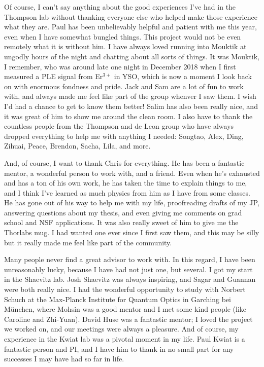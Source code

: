 \documentclass[12pt]{report}
\newcommand{\erbium}[1][ ]{Er$^{3+}$#1}
\begin{document}
Of course, I can't say anything about the good experiences I've had in the Thompson lab without thanking everyone else who helped make those experience what they are. Paul has been unbelievably helpful and patient with me this year, even when I have somewhat bungled things. This project would not be even remotely what it is without him. I have always loved running into Mouktik at ungodly hours of the night and chatting about all sorts of things. It was Mouktik, I remember, who was around late one night in December 2018 when I first measured a PLE signal from \erbium in YSO, which is now a moment I look back on with enormous fondness and pride. Jack and Sam are a lot of fun to work with, and always made me feel like part of the group whenver I saw them. I wish I'd had a chance to get to know them better! Salim has also been really nice, and it was great of him to show me around the clean room. I also have to thank the countless people from the Thompson and de Leon group who have always dropped everything to help me with anything I needed: Songtao, Alex, Ding, Zihuai, Peace, Brendon, Sacha, Lila, and more.

And, of course, I want to thank Chris for everything. He has been a fantastic mentor, a wonderful person to work with, and a friend. Even when he's exhausted and has a ton of his own work, he has taken the time to explain things to me, and I think I've learned as much physics from him as I have from some classes. He has gone out of his way to help me with my life, proofreading drafts of my JP, answering questions about my thesis, and even giving me comments on grad school and NSF applications. It was also really sweet of him to give me the Thorlabs mug. I had wanted one ever since I first saw them, and this may be silly but it really made me feel like part of the community.

Many people never find a great advisor to work with. In this regard, I have been unreasonably lucky, because I have had not just one, but several. I got my start in the Shaevitz lab. Josh Shaevitz was always inspiring, and Sagar and Guannan were both really nice. I had the wonderful opportunity to study with Norbert Schuch at the Max-Planck Institute for Quantum Optics in Garching bei M\"unchen, where Mohsin was a good mentor and I met some kind people (like Caroline and Zhi-Yuan). David Huse was a fantastic mentor; I loved the project we worked on, and our meetings were always a pleasure. And of course, my experience in the Kwiat lab was a pivotal moment in my life. Paul Kwiat is a fantastic person and PI, and I have him to thank in no small part for any successes I may have had so far in life.
\end{document}

